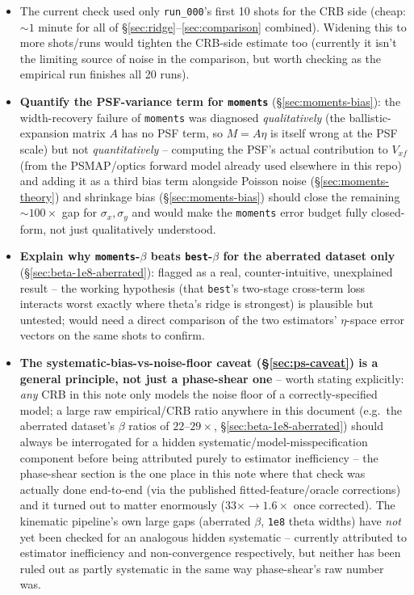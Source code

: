 \documentclass[11pt,a4paper]{article}
\newcommand{\code}[1]{\texttt{#1}}
\begin{document}
\begin{itemize}
    here; a dedicated matched-$N$ comparison (see below) would sharpen it.
  \item The current check used only \code{run\_000}'s first 10 shots for the
    CRB side (cheap: $\sim1$ minute for all of \S\ref{sec:ridge}--\ref{sec:comparison}
    combined). Widening this to more shots/runs would tighten the CRB-side
    estimate too (currently it isn't the limiting source of noise in the
    comparison, but worth checking as the empirical run finishes all 20
    runs).
  \item \textbf{Quantify the PSF-variance term for \code{moments}}
    (\S\ref{sec:moments-bias}): the width-recovery failure of \code{moments}
    was diagnosed \emph{qualitatively} (the ballistic-expansion matrix $A$
    has no PSF term, so $M=A\eta$ is itself wrong at the PSF scale) but not
    \emph{quantitatively} -- computing the PSF's actual contribution to
    $V_{xf}$ (from the PSMAP/optics forward model already used elsewhere in
    this repo) and adding it as a third bias term alongside Poisson noise
    (\S\ref{sec:moments-theory}) and shrinkage bias (\S\ref{sec:moments-bias})
    should close the remaining $\sim100\times$ gap for $\sigma_x,\sigma_y$
    and would make the \code{moments} error budget fully closed-form, not
    just qualitatively understood.
  \item \textbf{Explain why \code{moments}-$\beta$ beats \code{best}-$\beta$
    for the aberrated dataset only} (\S\ref{sec:beta-1e8-aberrated}): flagged
    as a real, counter-intuitive, unexplained result -- the working
    hypothesis (that \code{best}'s two-stage cross-term loss interacts worst
    exactly where theta's ridge is strongest) is plausible but untested;
    would need a direct comparison of the two estimators' $\eta$-space error
    vectors on the same shots to confirm.
  \item \textbf{The systematic-bias-vs-noise-floor caveat
    (\S\ref{sec:ps-caveat}) is a general principle, not just a phase-shear
    one} -- worth stating explicitly: \emph{any} CRB in this note only
    models the noise floor of a correctly-specified model; a large raw
    empirical/CRB ratio anywhere in this document (e.g.\ the aberrated
    dataset's $\beta$ ratios of $22$--$29\times$,
    \S\ref{sec:beta-1e8-aberrated}) should always be interrogated for a
    hidden systematic/model-misspecification component before being
    attributed purely to estimator inefficiency -- the phase-shear section
    is the one place in this note where that check was actually done
    end-to-end (via the published fitted-feature/oracle corrections) and it
    turned out to matter enormously ($33\times\to1.6\times$ once corrected).
    The kinematic pipeline's own large gaps (aberrated $\beta$, \code{1e8}
    theta widths) have \emph{not} yet been checked for an analogous hidden
    systematic -- currently attributed to estimator inefficiency and
    non-convergence respectively, but neither has been ruled out as
    partly systematic in the same way phase-shear's raw number was.
\end{itemize}
\end{document}
